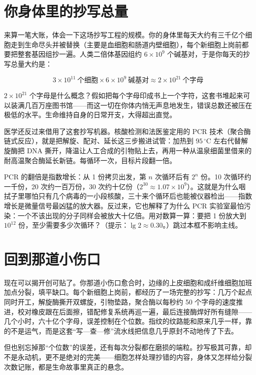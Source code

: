 \section{你身体里的抄写总量}

来算一笔大账，体会一下这场抄写工程的规模。你的身体里每天大约有三千亿个细胞走到生命尽头并被替换（主要是血细胞和肠道内壁细胞），每个新细胞上岗前都要把整套基因组抄一遍。人类二倍体基因组约 $6\times10^{9}$ 个碱基对，于是你每天的抄写总量大约是：

\[3\times10^{11}\ \text{个细胞}\times 6\times10^{9}\ \text{碱基对}\approx 2\times10^{21}\ \text{个字母}\]

$2\times10^{21}$ 个字母是什么概念？假如把每个字母印成书上一个字符，这套书堆起来可以装满几百万座图书馆——而这一切在你体内悄无声息地发生，错误总数还被压在极低的水平。生命维持自身的日常开支，大得超出直觉。

医学还反过来借用了这套抄写机器。核酸检测和法医鉴定用的 PCR 技术（聚合酶链式反应），就是把解旋、配对、延长这三步搬进试管：加热到 $95\,^{\circ}\mathrm{C}$ 左右代替解旋酶把 DNA 撕开，降温让人工合成的引物贴上去，再用一种从温泉细菌里借来的耐高温聚合酶延长新链。每循环一次，目标片段翻一倍。

\begin{tiaozhan}
PCR 的翻倍是指数增长：从 1 份拷贝出发，第 $n$ 次循环后有 $2^{n}$ 份。10 次循环约一千份，20 次约一百万份，30 次约十亿份（$2^{30}\approx1.07\times10^{9}$）。这就是为什么咽拭子里哪怕只有几个病毒的一小段核酸，三十来个循环后也能被仪器检出——指数增长是微量信号最凶猛的放大器。反过来，它也解释了为什么 PCR 实验室最怕污染：一个不该出现的分子同样会被放大十亿倍。用对数算一算：要把 1 份放大到 $10^{12}$ 份，至少需要多少次循环？（提示：$\lg 2\approx0.30$。）跳过本框不影响主线。
\end{tiaozhan}

\section{回到那道小伤口}

现在可以揭开创可贴了。你那道小伤口愈合时，边缘的上皮细胞和成纤维细胞加班加点分裂，填平缺口。每个新细胞上岗前，都经历了一场完整的抄写：几万个起点同时开工，解旋酶撕开双螺旋，引物垫路，聚合酶以每秒约 50 个字母的速度推进，校对橡皮跟在后面擦，错配修复系统再巡一遍，最后连接酶焊好所有缝隙——几个小时，六十亿个字母，误差控制在个位数。指纹的纹路能和原来几乎一样，靠的不是运气，而是这套“写—查—修”流水线把信息几乎原封不动地传了下去。

但也别忘掉那“个位数”的误差，还有每次分裂都在磨损的端粒。抄写极其可靠，却不是永动机，更不是绝对的完美——细胞怎样处理抄错的内容，身体又怎样给分裂次数记账，都是生命故事里真正的悬念。

